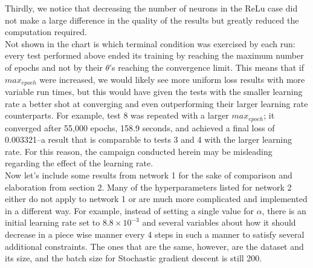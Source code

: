 \documentclass[reqno,14pt]{amsart}
\theoremstyle{plain}
\theoremstyle{definition}
\theoremstyle{remark}
\begin{document}
Thirdly, we notice that decreasing the number of neurons in the ReLu case did not make a large difference in the quality of the results but greatly reduced the computation required. \\

Not shown in the chart is which terminal condition was exercised by each run: every test performed above ended its training by reaching the maximum number of epochs and not by their $\theta$'s reaching the convergence limit. This means that if $max_{epoch}$ were increased, we would likely see more uniform loss results with more variable run times, but this would have given the tests with the smaller learning rate a better shot at converging and even outperforming their larger learning rate counterparts. For example, test 8 was repeated with a larger $max_{epoch}$; it converged after 55,000 epochs, 158.9 seconds, and achieved a final loss of 0.003321--a result that is comparable to tests 3 and 4 with the larger learning rate. For this reason, the campaign conducted herein may be misleading regarding the effect of the learning rate.\\

Now let's include some results from network 1 for the sake of comparison and elaboration from section 2. Many of the hyperparameters listed for network 2 either do not apply to network 1 or are much more complicated and implemented in a different way. For example, instead of setting a single value for $\alpha$, there is an initial learning rate set to $8.8 \times 10^{-3}$ and several variables about how it should decrease in a piece wise manner every 4 steps in such a manner to satisfy several additional constraints. The ones that are the same, however, are the dataset and its size, and the batch size for Stochastic gradient descent is still 200.\\
\end{document}
